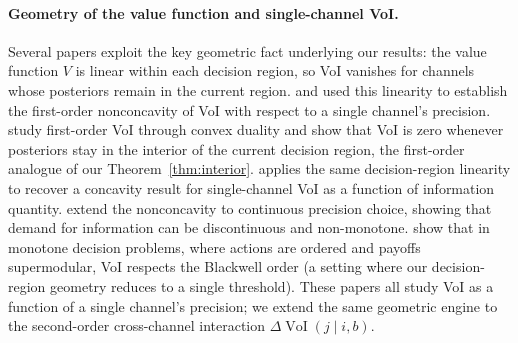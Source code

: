 \documentclass{article}
\newcommand{\VoI}{\operatorname{VoI}}
\begin{document}
\paragraph{Geometry of the value function and single-channel VoI.}
Several papers exploit the key geometric fact underlying our results: the value function $V$ is linear within each decision region, so VoI vanishes for channels whose posteriors remain in the current region.
\citet{RadnerStiglitz1984} and \citet{ChadeSchlee2002} used this linearity to establish the first-order nonconcavity of VoI with respect to a single channel's precision.
\citet{DeLaraGossner2020} study first-order VoI through convex duality and show that VoI is zero whenever posteriors stay in the interior of the current decision region, the first-order analogue of our Theorem~\ref{thm:interior}.
\citet{Whitmeyer2024} applies the same decision-region linearity to recover a concavity result for single-channel VoI as a function of information quantity.
\citet{KeppoMoscariniSmith2008} extend the \citeauthor{RadnerStiglitz1984} nonconcavity to continuous precision choice, showing that demand for information can be discontinuous and non-monotone.
\citet{AtheyLevin2018} show that in monotone decision problems, where actions are ordered and payoffs supermodular, VoI respects the Blackwell order (a setting where our decision-region geometry reduces to a single threshold).
These papers all study VoI as a function of a single channel's precision; we extend the same geometric engine to the second-order cross-channel interaction $\Delta\VoI(j \mid i, b)$.
\end{document}
